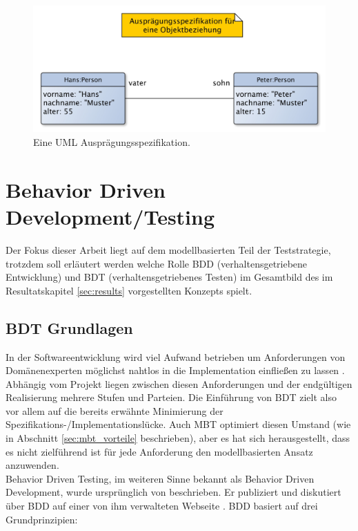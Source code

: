 \begin{figure}[h] 
  \centering
     \includegraphics[width=1.0\textwidth]{figures/uml_instance.jpeg}
  \caption{Eine UML Ausprägungsspezifikation.}
  \label{fig:uml_instance}
\end{figure}


\section{Behavior Driven Development/Testing}
\label{sec:bdd}

Der Fokus dieser Arbeit liegt auf dem modellbasierten Teil der Teststrategie, trotzdem soll erläutert werden welche Rolle \Gls{BDD} (verhaltensgetriebene Entwicklung) und \Gls{BDT} (verhaltensgetriebenes Testen) im Gesamtbild des im Resultatskapitel \ref{sec:results} vorgestellten Konzepts spielt.

\subsection{BDT Grundlagen}
In der Softwareentwicklung wird viel Aufwand betrieben um Anforderungen von Domänenexperten möglichst nahtlos in die Implementation einfließen zu lassen \cite{saqib_human_2014}. Abhängig vom Projekt liegen zwischen diesen Anforderungen und der endgültigen Realisierung mehrere Stufen und Parteien. Die Einführung von \Gls{BDT} zielt also vor allem auf die bereits erwähnte Minimierung der Spezifikations-/Implementationslücke. Auch \Gls{MBT} optimiert diesen Umstand (wie in Abschnitt \ref{sec:mbt_vorteile} beschrieben), aber es hat sich herausgestellt, dass es nicht zielführend ist für jede Anforderung den modellbasierten Ansatz anzuwenden.\\
Behavior Driven Testing, im weiteren Sinne bekannt als Behavior Driven Development, wurde ursprünglich von \citeauthor{north_official_2015} beschrieben. Er publiziert und diskutiert über \gls{BDD} auf einer von ihm verwalteten Webseite \cite{north_official_2015}. \gls{BDD} basiert auf drei Grundprinzipien:

